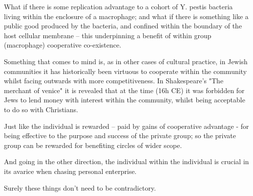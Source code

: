 What if there is some replication advantage to a cohort of Y. pestis bacteria living within the enclosure of a macrophage; and what if there is something like a public good produced by the bacteria, and confined within the boundary of the host cellular membrane -- this underpinning a benefit of within group (macrophage) cooperative co-existence. \par 

\vspace{10pt}
\noindent
Something that comes to mind is,  as in other cases of cultural practice,  in Jewish communities it has historically been virtuous to cooperate within the community whilst facing outwards with more competitiveness.  In Shakespeare's "The merchant of venice" it is revealed that at the time (16h CE) it was forbidden for Jews to lend money with interest within the community,  whilst being acceptable to do so with Christians. \par

\vspace{10pt}
\noindent
Just like the individual is rewarded -- paid by gains of cooperative advantage - for being effective to the purpose and success of the private group; so the private group can be rewarded for benefiting circles of wider scope.\par 
And going in the other direction, the individual within the individual is crucial in its avarice when chasing personal enterprise. \par 
Surely these things don't need to be contradictory. 



